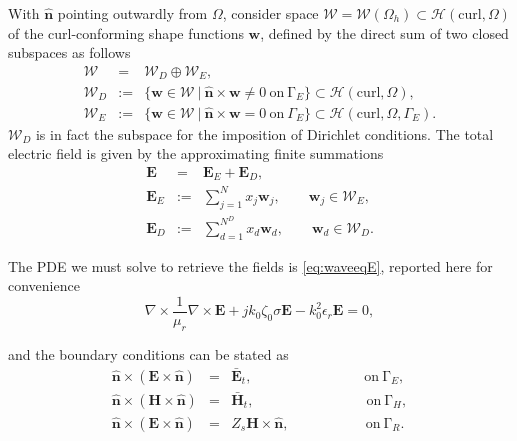 With $\hat{\mathbf{n}}$ pointing outwardly from $\Omega$, consider space $\mathcal{W} = \mathcal{W}(\Omega_h) \subset \mathcal{H}(\mathrm{curl}, \Omega)$ of the curl-conforming shape functions $\mathbf{w}$, defined by the direct sum of two closed subspaces as follows
\begin{eqnarray}
\mathcal{W} &= & \mathcal{W}_D \oplus \mathcal{W}_E, \nonumber \\[5pt]
\mathcal{W}_D &:= & \{ \mathbf{w} \in \mathcal{W} \ | \ \hat{\mathbf{n}} \times \mathbf{w} \neq 0 \ \mathrm{on} \ \mathrm{\Gamma}_E \} \subset \mathcal{H}(\mathrm{curl},\Omega), \nonumber \\
\mathcal{W}_E &:= & \{ \mathbf{w} \in \mathcal{W} \ | \ \hat{\mathbf{n}} \times \mathbf{w} = 0 \ \mathrm{on} \ \Gamma_E \} \subset \mathcal{H}(\mathrm{curl},\Omega, \Gamma_E).\nonumber
\end{eqnarray} $\mathcal{W}_D$ is in fact the subspace for the imposition of Dirichlet conditions. The total electric field is given by the approximating finite summations
\begin{eqnarray}
\label{eq:fieldExp}
\mathbf{E} & = & \mathbf{E}_E + \mathbf{E}_D, \nonumber \\[5pt]
\mathbf{E}_E &:= & \sum_{j=1}^{N} x_j \mathbf{w}_j, \qquad \mathbf{w}_j \in \mathcal{W}_E, \nonumber \\
\mathbf{E}_D&:= & \sum_{d=1}^{N^D} x_d \mathbf{w}_d, \qquad \mathbf{w}_d \in \mathcal{W}_D.\nonumber
\end{eqnarray} 

The PDE we must solve to retrieve the fields is \eqref{eq:waveeqE}, reported here for convenience
$$ \nabla \times \frac{1}{\mu_r} \nabla \times {\mathbf{E}} + j k_0 \zeta_0 \sigma {\mathbf{E}} - k_0^2 \epsilon_r {\mathbf{E}} =  0, $$

\noindent and the boundary conditions can be stated as
\begin{eqnarray}
\hat{\mathbf{n}} \times ( {\mathbf{E}} \times \hat{\mathbf{n}}) & = & \bar{\mathbf{E}}_t, \qquad \qquad \qquad \qquad \! \mathrm{on} \ \mathrm{\Gamma}_E, \\
\hat{\mathbf{n}} \times ( {\mathbf{H}} \times \hat{\mathbf{n}}) & = & \bar{\mathbf{H}}_t, \qquad \qquad \qquad \qquad \! \! \mathrm{on} \ \mathrm{\Gamma}_{H}, \\
\hat{\mathbf{n}} \times ( {\mathbf{E}} \times \hat{\mathbf{n}}) & = & Z_s {\mathbf{H}} \times \hat{\mathbf{n}}, \qquad \qquad \quad \ \  \mathrm{on} \ \mathrm{\Gamma}_R. \label{eq:ABC}%
\end{eqnarray} 

